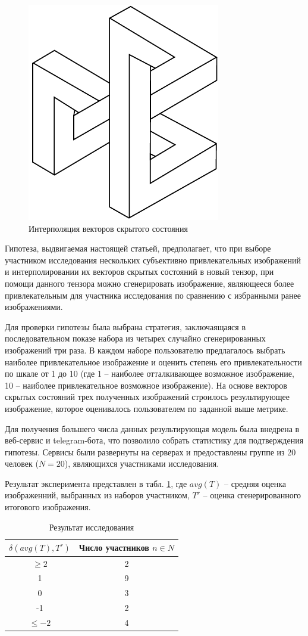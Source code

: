 \documentclass[60x84/16,8pt]{ittmm}
\begin{document}
\begin{figure}
  \centering
  \includegraphics[width=0.2\linewidth]{embl}
  \caption{Интерполяция векторов скрытого состояния}
  \label{fig:interpolation}
\end{figure}

Гипотеза, выдвигаемая настоящей статьей, предполагает, что при выборе участником исследования
нескольких субъективно привлекательных изображений и интерполировании их векторов скрытых
состояний в новый тензор, при помощи данного тензора можно сгенерировать изображение,
являющееся более привлекательным для участника исследования по сравнению с избранными ранее
изображениями.

Для проверки гипотезы была выбрана стратегия, заключаящаяся в последовательном показе набора из четырех
случайно сгенерированных изображений три раза. В каждом наборе пользователю предлагалось выбрать
наиболее привлекательное изображение и оценить степень его привлекательности по шкале от 1 до 10
(где 1 -- наиболее отталкивающее возможное изображение, 10 -- наиболее привлекательное возможное изображение).
На основе векторов скрытых состояний трех полученных изображений строилось результирующее изображение,
которое оценивалось пользователем по заданной выше метрике.

Для получения большего числа данных результирующая модель была внедрена
в веб-сервис и telegram-бота, что позволило собрать статистику для подтверждения гипотезы.
Сервисы были развернуты на серверах и предоставлены группе из 20 человек (\(N = 20\)), являющихся участниками
исследования.

Результат эксперимента представлен в табл. \ref{tab:experiment},
где \(avg(T)\) -- средняя оценка изображенний, выбранных из наборов участником,
\(T^r\) -- оценка сгенерированного итогового изображения.

\begin{table}
  \centering
  \caption{Результат исследования}
  \label{tab:experiment}
  \begin{tabular}{|c|c|}
    \hline
    \(\delta (avg(T), T^r)\) & Число участников \(n \in N\) \\
    \hline
    \(\ge 2\) & 2 \\
    1         & 9 \\
    0         & 3 \\
    -1        & 2 \\
    \(\le -2\)& 4 \\
    \hline
  \end{tabular}
\end{table}
\end{document}
